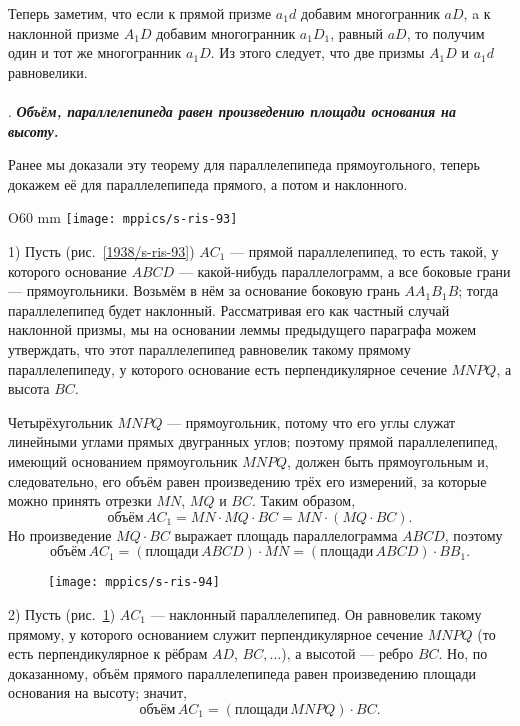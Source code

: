 Теперь заметим, что если к прямой призме $a_1d$ добавим многогранник $aD$,
a к наклонной призме $A_1D$ добавим многогранник $a_1D_1$, равный $aD$, то получим один и тот же многогранник $a_1D$.
Из этого следует, что две призмы $A_1D$ и $a_1d$ равновелики.

\paragraph{}\label{1938/s87}
.
\textbf{\emph{Объём, параллелепипеда равен произведению площади основания на высоту.}}

Ранее мы доказали эту теорему для параллелепипеда прямоугольного, теперь докажем её для параллелепипеда прямого, а потом и наклонного.

\begin{wrapfigure}{O}{60 mm}
\vskip-0mm
\centering
\texttt{[image: mppics/s-ris-93]}
\caption{}\label{1938/s-ris-93}
\vskip-0mm
\end{wrapfigure}

1) Пусть (рис.~\ref{1938/s-ris-93}) $AC_1$ — прямой параллелепипед, то есть такой, у которого основание $ABCD$ — какой-нибудь параллелограмм, а все боковые грани — прямоугольники.
Возьмём в нём за основание боковую грань $AA_1B_1B$;
тогда параллелепипед будет наклонный.
Рассматривая его как частный случай наклонной призмы, мы на основании леммы предыдущего параграфа можем утверждать, что этот параллелепипед равновелик такому прямому параллелепипеду, у которого основание есть перпендикулярное сечение $MNPQ$, а высота $BC$.

Четырёхугольник $MNPQ$ — прямоугольник, потому что его углы служат линейными углами прямых двугранных углов;
поэтому прямой параллелепипед, имеющий основанием прямоугольник $MNPQ$, должен быть прямоугольным и, следовательно, его объём равен произведению трёх его измерений, за которые можно принять отрезки $MN$, $MQ$ и $BC$.
Таким образом,
\[\text{объём}\, AC_1 = MN\cdot MQ\cdot BC = MN\cdot (MQ\cdot BC).\]
Но произведение $MQ\cdot BC$ выражает площадь параллелограмма $ABCD$, поэтому
\[
\text{объём}\, AC_1
= (\text{площади}\, ABCD)\cdot MN
= (\text{площади}\, ABCD)\cdot BB_1.
\]

\begin{figure}[!ht]%
\centering
\texttt{[image: mppics/s-ris-94]}
\caption{}\label{1938/s-ris-94}
\vskip-0mm
\end{figure}

2) Пусть (рис.~\ref{1938/s-ris-94}) $AC_1$ — наклонный параллелепипед.
Он равновелик такому прямому, у которого основанием служит перпендикулярное сечение $MNPQ$ (то есть перпендикулярное к рёбрам $AD$, $BC,\dots$), а высотой — ребро $BC$.
Но, по доказанному, объём прямого параллелепипеда равен произведению площади основания на высоту;
значит,
\[\text{объём}\, AC_1 = (\text{площади}\, MNPQ)\cdot BC.\]

